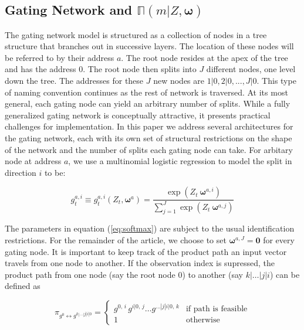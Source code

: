 \documentclass[12pt]{article}
\newcommand{\gateprod}[2]{\pi_{#1 \longleftrightarrow #2}}
\newcommand{\expmixwt}[0]{\mathbb{\Pi}}
\begin{document}
\subsection{Gating Network and $\expmixwt(m | Z, \boldsymbol{\omega})$} \label{subsec:GatingNetwork}

The gating network model is structured as a collection of nodes in a tree
structure that branches out in successive layers. The location of these nodes will
be referred to by their address $a$. The root node resides at the apex of the tree
and has the address $0$. The root node then splits into $J$ different nodes,
one level down the tree. The addresses for these $J$ new nodes are 
$1|0, 2|0, ..., J|0$. This type of naming convention continues as the
rest of network is traversed. At its most general, each gating node can yield an
arbitrary number of splits. While a fully generalized gating network is
conceptually attractive, it presents practical challenges for implementation.
In this paper we address several architectures for the gating network, each
with its own set of structural restrictions on the shape of the network and
the number of splits each gating node can take. For arbitary node at address $a$,
we use a multinomial logistic regression to model the split in direction $i$ to be:

\begin{equation} \label{eq:softmax}
  g^{a,i}_{t} \equiv g^{a,i}_{t}(Z_{t}, \boldsymbol{\omega}^{a}) = \frac{\exp(Z_{t} \ \boldsymbol{\omega}^{a,i})}{\sum^{J}_{j=1} {\exp(Z_{t} \ \boldsymbol{\omega}^{a,j})}}
\end{equation}

The parameters in equation (\ref{eq:softmax}) are subject to the usual
identification restrictions. For the remainder of the article, we choose
to set $\boldsymbol{\omega}^{a,J} = \boldsymbol{0}$ for every gating node.
It is important to keep track of the product path an input vector travels from
one node to another. If the observation index is supressed, the product path
from one node (say the root node $0$) to another (say $k|\ldots|j|i$)
can be defined as

\begin{equation} \label{eq:gpath}
  \gateprod{g^{0}}{g^{k|\ldots|j|i|0}} =
    \begin{cases} 
       g^{0, \, i} \, g^{i|0, \, j} \ldots g^{\dots|j|i|0, \, k} & \textrm{if path is feasible} \\
       1 & \textrm{otherwise}
    \end{cases}
\end{equation}
\end{document}
